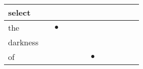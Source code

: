 \documentclass[landscape]{article}
\newcommand{\ssp}{\hspace{2pt}}
\newcommand{\mex}{\cellcolor{g}$\bullet$}
\begin{document}
\begin{tabular}{|l|p{10pt}|p{10pt}|p{10pt}|p{10pt}|p{10pt}|p{10pt}|p{10pt}|p{10pt}|p{10pt}|p{10pt}|p{10pt}|}
\hline
\ssp select \ssp&\hspace{2pt}&\hspace{2pt}&\hspace{2pt}&\hspace{2pt}&\hspace{2pt}&\hspace{2pt}&\hspace{2pt}&\hspace{2pt}&\hspace{2pt}&\hspace{2pt}&\hspace{2pt}\\
\hline
\ssp \cellcolor{ref1}the \ssp&\hspace{2pt}&\hspace{2pt}\mex&\hspace{2pt}&\hspace{2pt}&\hspace{2pt}&\hspace{2pt}&\hspace{2pt}&\hspace{2pt}&\hspace{2pt}&\hspace{2pt}&\hspace{2pt}\\
\hline
\ssp darkness \ssp&\hspace{2pt}&\hspace{2pt}&\hspace{2pt}&\hspace{2pt}&\hspace{2pt}&\hspace{2pt}&\hspace{2pt}&\hspace{2pt}&\hspace{2pt}&\hspace{2pt}&\hspace{2pt}\\
\hline
\ssp \cellcolor{ref5}of \ssp&\hspace{2pt}&\hspace{2pt}&\hspace{2pt}&\hspace{2pt}&\hspace{2pt}&\hspace{2pt}\mex&\hspace{2pt}&\hspace{2pt}&\hspace{2pt}&\hspace{2pt}&\hspace{2pt}\\

\end{tabular}
\end{document}
